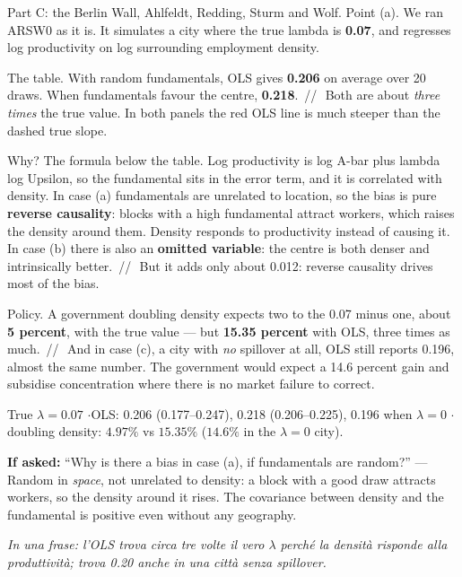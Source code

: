 \documentclass[11pt,a4paper]{article}
\newcommand{\idea}[1]{\par{\small\itshape\color{unicablue}In una frase: #1}\par}
\newcommand{\pause}{\textcolor{unicared}{\,/\!/\,}}
\begin{document}
\begin{say}
Part C: the Berlin Wall, Ahlfeldt, Redding, Sturm and Wolf. Point (a). We ran ARSW0 as it is. It simulates a city where the true lambda is \textbf{0.07}, and regresses log productivity on log surrounding employment density.

The table. With random fundamentals, OLS gives \textbf{0.206} on average over 20 draws. When fundamentals favour the centre, \textbf{0.218}. \pause\ Both are about \emph{three times} the true value. In both panels the red OLS line is much steeper than the dashed true slope.

Why? The formula below the table. Log productivity is log A-bar plus lambda log Upsilon, so the fundamental sits in the error term, and it is correlated with density. In case (a) fundamentals are unrelated to location, so the bias is pure \textbf{reverse causality}: blocks with a high fundamental attract workers, which raises the density around them. Density responds to productivity instead of causing it. In case (b) there is also an \textbf{omitted variable}: the centre is both denser and intrinsically better. \pause\ But it adds only about 0.012: reverse causality drives most of the bias.

Policy. A government doubling density expects two to the 0.07 minus one, about \textbf{5 percent}, with the true value --- but \textbf{15.35 percent} with OLS, three times as much. \pause\ And in case (c), a city with \emph{no} spillover at all, OLS still reports 0.196, almost the same number. The government would expect a 14.6 percent gain and subsidise concentration where there is no market failure to correct.
\end{say}

\begin{nums}
True $\lambda = 0.07$ \quad$\cdot$\quad OLS: 0.206 (0.177--0.247), 0.218 (0.206--0.225), 0.196 when $\lambda=0$ \quad$\cdot$\quad doubling density: $4.97\%$ vs $15.35\%$ ($14.6\%$ in the $\lambda=0$ city).
\end{nums}
\begin{ask}
\textbf{If asked:} ``Why is there a bias in case (a), if fundamentals are random?'' --- Random in \emph{space}, not unrelated to density: a block with a good draw attracts workers, so the density around it rises. The covariance between density and the fundamental is positive even without any geography.
\end{ask}
\idea{l'OLS trova circa tre volte il vero $\lambda$ perché la densità risponde alla produttività; trova 0.20 anche in una città senza spillover.}
\end{document}
